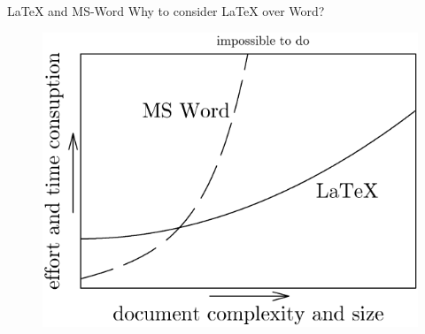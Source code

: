 \documentclass[aspectratio=169]{beamer}
\begin{document}
\begin{frame}{\LaTeX{} and MS-Word}
    Why to consider \LaTeX{} over Word?
    \begin{figure}
        \centering
        \includegraphics[scale=0.4]{images/miktex.png}
        \label{fig:latex_word_pain}
    \end{figure}
\end{frame}
\end{document}
